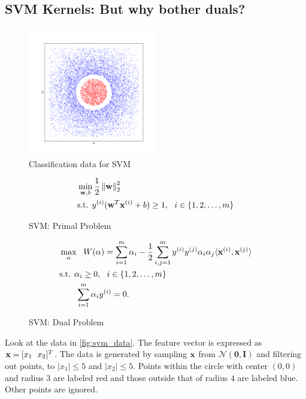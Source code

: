 \subsection{SVM Kernels: But why bother duals?}

\begin{figure}[H]
\centering
\includegraphics[width=0.5\textwidth]{images/svm.png}
\caption{Classification data for SVM}
\label{fig:svm_data}
\end{figure}
\begin{figure}[H]
    \centering
    \begin{align*}
        &\min_{\mathbf{w}, b} \frac{1}{2}\left\lVert\mathbf{w}\right\rVert_2^2 \\
        &\text{s.t. } y^{(i)} (\mathbf{w}^T \mathbf{x}^{(i)} + b) \geq 1, \ \ i \in \{1, 2, \dots, m\}
    \end{align*}
    \caption{SVM: Primal Problem}
    \label{fig:svm_primal}
\end{figure}

\begin{figure}[H]
    \centering
    \begin{align*}
    &\max_{\alpha} \ \  W(\alpha) = \sum_{i=1}^{m} \alpha_i - \frac{1}{2} \sum_{i,j=1}^{m} y^{(i)} y^{(j)} \alpha_i \alpha_j \langle \mathbf{x}^{(i)}, \mathbf{x}^{(j)} \rangle\\
    &\text{s.t. } \alpha_i \geq 0,  \ \ i \in  \{1, 2, \dots, m\}\\
    &\qquad \sum_{i=1}^{m} \alpha_i y^{(i)} = 0.
    \end{align*}
    \caption{SVM: Dual Problem}
    \label{fig:svm_dual}
\end{figure}


Look at the data in \autoref{fig:svm_data}. The feature vector is expressed as $\mathbf{x} = [x_1 \ \ x_2]^T$. The data is generated by sampling $\mathbf{x}$ from $\mathcal{N}(\mathbf{0}, \mathbf{I})$ and filtering out points, to $|x_1| \leq 5$ and $|x_2| \leq 5$. Points within the circle with center $(0, 0)$ and radius $3$ are labeled red and those outside that of radius $4$ are labeled blue. Other points are ignored.

